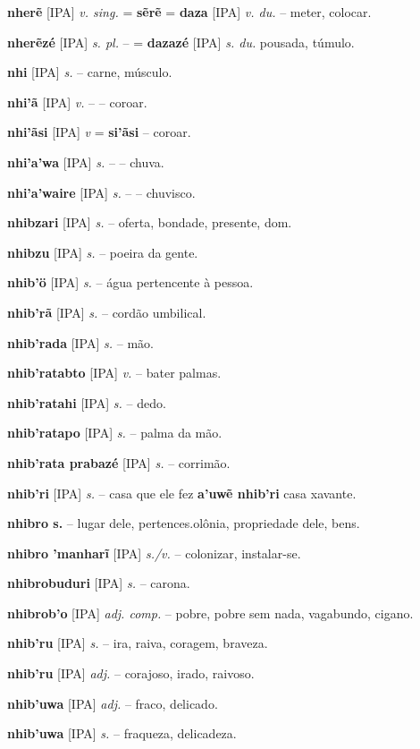 \textbf{nherẽ} [IPA] \textit{v. sing.} = \textbf{sẽrẽ} = \textbf{daza} [IPA] \textit{v. du.} -- meter, colocar.

\textbf{nherẽzé} [IPA] \textit{s. pl.} -- = \textbf{dazazé} [IPA] \textit{s. du.} pousada, túmulo.

\textbf{nhi} [IPA] \textit{s.} -- carne, músculo.

\textbf{nhi'ã} [IPA] \textit{v.} -- -- coroar.

\textbf{nhi'ãsi} [IPA] \textit{v} = \textbf{si'ãsi} -- coroar.

\textbf{nhi'a'wa} [IPA] \textit{s.} -- -- chuva.

\textbf{nhi'a'waire} [IPA] \textit{s.} -- -- chuvisco.

\textbf{nhibzari} [IPA] \textit{s.} -- oferta, bondade, presente, dom.

\textbf{nhibzu} [IPA] \textit{s.} -- poeira da gente.

\textbf{nhib'ö} [IPA] \textit{s.} -- água pertencente à pessoa.

\textbf{nhib'rã} [IPA] \textit{s.} -- cordão umbilical.

\textbf{nhib'rada} [IPA] \textit{s.} -- mão.

\textbf{nhib'ratabto} [IPA] \textit{v.} -- bater palmas.

\textbf{nhib'ratahi} [IPA] \textit{s.} -- dedo.

\textbf{nhib'ratapo} [IPA] \textit{s.} -- palma da mão.

\textbf{nhib'rata prabazé} [IPA] \textit{s.} -- corrimão.

\textbf{nhib'ri} [IPA] \textit{s.} -- casa que ele fez  \textbf{a'uwẽ nhib'ri} casa xavante.

\textbf{nhibro s.} -- lugar dele, pertences.olônia, propriedade dele, bens.

\textbf{nhibro 'manharĩ} [IPA] \textit{s./v.} -- colonizar, instalar-se.

\textbf{nhibrobuduri} [IPA] \textit{s.} -- carona.

\textbf{nhibrob'o} [IPA] \textit{adj. comp.} -- pobre, pobre sem nada, vagabundo, cigano.

\textbf{nhib'ru} [IPA] \textit{s.} -- ira, raiva, coragem, braveza.

\textbf{nhib'ru} [IPA] \textit{adj.} -- corajoso, irado, raivoso.

\textbf{nhib'uwa} [IPA] \textit{adj.} -- fraco, delicado.

\textbf{nhib'uwa} [IPA] \textit{s.} -- fraqueza, delicadeza.

